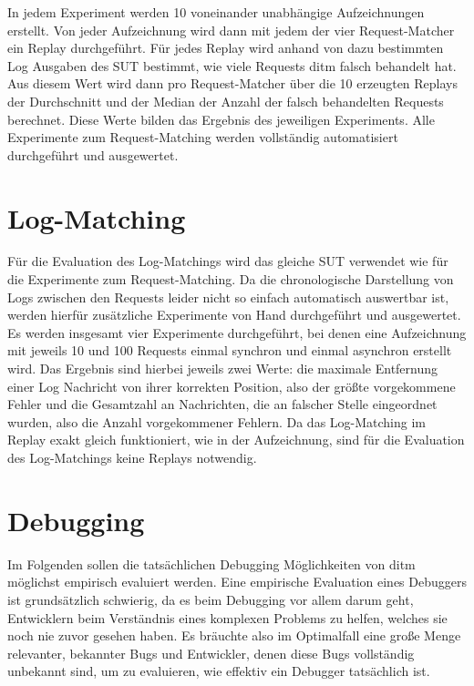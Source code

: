 \documentclass[12pt,a4paper]{report}
\begin{document}
In jedem Experiment werden 10 voneinander unabhängige Aufzeichnungen erstellt. Von jeder Aufzeichnung wird dann mit jedem der vier
Request-Matcher ein Replay durchgeführt. Für jedes Replay wird anhand von dazu bestimmten Log Ausgaben des SUT bestimmt, wie viele
Requests ditm falsch behandelt hat. Aus diesem Wert wird dann pro Request-Matcher über die 10 erzeugten Replays der Durchschnitt
und der Median der Anzahl der falsch behandelten Requests berechnet. Diese Werte bilden das Ergebnis des jeweiligen Experiments.
Alle Experimente zum Request-Matching werden vollständig automatisiert durchgeführt und ausgewertet.

\section{Log-Matching}
\label{chap:exp_logs}
Für die Evaluation des Log-Matchings wird das gleiche SUT verwendet wie für die Experimente zum Request-Matching.
Da die chronologische Darstellung von Logs zwischen den Requests leider nicht so einfach automatisch auswertbar ist, werden
hierfür zusätzliche Experimente von Hand durchgeführt und ausgewertet. Es werden insgesamt vier Experimente durchgeführt, bei
denen eine Aufzeichnung mit jeweils 10 und 100 Requests einmal synchron und einmal asynchron erstellt wird. Das Ergebnis sind
hierbei jeweils zwei Werte: die maximale Entfernung einer Log Nachricht von ihrer korrekten Position, also der größte vorgekommene
Fehler und die Gesamtzahl an Nachrichten, die an falscher Stelle eingeordnet wurden, also die Anzahl vorgekommener Fehlern. Da das
Log-Matching im Replay exakt gleich funktioniert, wie in der Aufzeichnung, sind für die Evaluation des Log-Matchings keine Replays
notwendig.

\section{Debugging}
\label{chap:debugging_exp}
Im Folgenden sollen die tatsächlichen Debugging Möglichkeiten von ditm möglichst empirisch evaluiert werden. Eine empirische
Evaluation eines Debuggers ist grundsätzlich schwierig, da es beim Debugging vor allem darum geht, Entwicklern beim
Verständnis eines komplexen Problems zu helfen, welches sie noch nie zuvor gesehen haben. Es bräuchte also im Optimalfall eine
große Menge relevanter, bekannter Bugs und Entwickler, denen diese Bugs vollständig unbekannt sind, um zu evaluieren, wie effektiv
ein Debugger tatsächlich ist.
\end{document}
